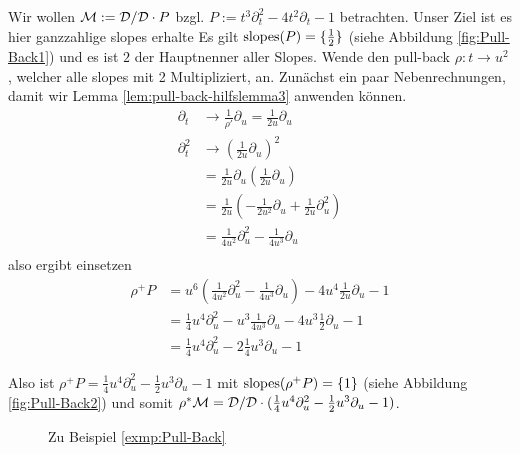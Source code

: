 \begin{exmp}
Wir wollen $\mathcal{M}:=\mathcal{D}/\mathcal{D}\cdot P$ bzgl. $P:= t^3\partial_t^2-4t^2\partial_t-1$
betrachten.
Unser Ziel ist es hier ganzzahlige slopes erhalte
Es gilt $ \operatorname{slopes}(P)=\{\frac{1}{2}\} $ (siehe Abbildung \ref{fig:Pull-Back1})
und es ist $2$ der Hauptnenner aller Slopes.
Wende den pull-back
$\rho:t\rightarrow u^2$, welcher alle slopes mit 2 Multipliziert,
an.
Zunächst ein paar Nebenrechnungen, damit wir Lemma
\ref{lem:pull-back-hilfslemma3} anwenden können.
\begin{align*}
\partial_t   &\rightarrow \frac{1}{\rho'}\partial_u=\frac{1}{2u}\partial_u \\
\partial_t^2 &\rightarrow (\frac{1}{2u}\partial_u)^2 \\
             &= \frac{1}{2u}\partial_u (\frac{1}{2u}\partial_u) \\
             &= \frac{1}{2u}(-\frac{1}{2u^2}\partial_u +
               \frac{1}{2u}\partial_u^2) \\
             &= \frac{1}{4u^2}\partial_u^2-\frac{1}{4u^3}\partial_u \\
\end{align*}
also ergibt einsetzen
\begin{align*}
\rho^+P &= u^6(\frac{1}{4u^2}\partial_u^2-\frac{1}{4u^3}\partial_u)-
          4u^{4}\frac{1}{2u}\partial_u-1\\
        &= \frac{1}{4}u^4\partial_u^2-u^3\frac{1}{4u^3}\partial_u-
          4u^{3}\frac{1}{2}\partial_u-1\\
        &= \frac{1}{4}u^4\partial_u^2 -2\frac{1}{4}u^3\partial_u-1
\end{align*}

Also ist $\rho^+P= \frac{1}{4}u^4\partial_u^2 -\frac{1}{2}u^3\partial_u-1$ mit
$ \operatorname{slopes}(\rho^+P)=\{1\} $ (siehe Abbildung \ref{fig:Pull-Back2}) und somit
$\rho^*\mathcal{M}=\mathcal{D}/\mathcal{D}\cdot (\frac{1}{4}u^4\partial_u^2
-\frac{1}{2}u^3\partial_u-1)$.
\begin{figure}[H]
\label{fig:Pull-Back}
\caption{Zu Beispiel \ref{exmp:Pull-Back}}
\begin{center}
\end{center}
\end{figure}
\end{exmp}

